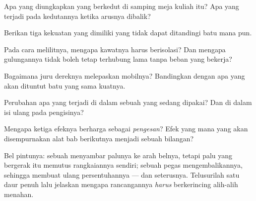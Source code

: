 \begin{exercise}[$\star$]\label{exo:g8:electric-current-effects:3}
Apa yang diungkapkan  yang berkedut di samping meja kuliah itu?
Apa yang terjadi pada kedutannya ketika arusnya dibalik?
\end{exercise}

\begin{exercise}[$\star$]\label{exo:g8:electric-current-effects:4}
Berikan tiga kekuatan yang dimiliki  yang tidak dapat
ditandingi  batu mana pun.
\end{exercise}

\begin{exercise}[$\star$]\label{exo:g8:electric-current-effects:5}
Pada cara melilitnya, mengapa kawatnya harus berisolasi? Dan mengapa
gulungannya tidak boleh tetap terhubung lama tanpa beban yang bekerja?
\end{exercise}

\begin{exercise}[$\star$]\label{exo:g8:electric-current-effects:6}
Bagaimana juru dereknya melepaskan mobilnya? Bandingkan dengan apa
yang akan dituntut  batu yang sama kuatnya.
\end{exercise}

\begin{exercise}[$\star$]\label{exo:g8:electric-current-effects:7}
Perubahan  apa yang terjadi di dalam sebuah  yang sedang
dipakai? Dan di dalam  isi ulang pada pengisinya?
\end{exercise}

\begin{exercise}[$\star$]\label{exo:g8:electric-current-effects:8}
Mengapa ketiga efeknya berharga sebagai \emph{pengesan}? Efek yang
mana yang akan disempurnakan alat bab berikutnya menjadi sebuah
bilangan?
\end{exercise}

\begin{exercise}[$\star\star$]\label{exo:g8:electric-current-effects:9}
Bel pintunya: sebuah  menyambar palunya ke arah belnya,
tetapi palu yang bergerak itu memutus rangkaiannya sendiri; sebuah
pegas mengembalikannya, sehingga membuat ulang persentuhannya --- dan
seterusnya. Telusurilah satu daur penuh lalu jelaskan mengapa
rancangannya \emph{harus} berkerincing alih-alih menahan.
\end{exercise}

